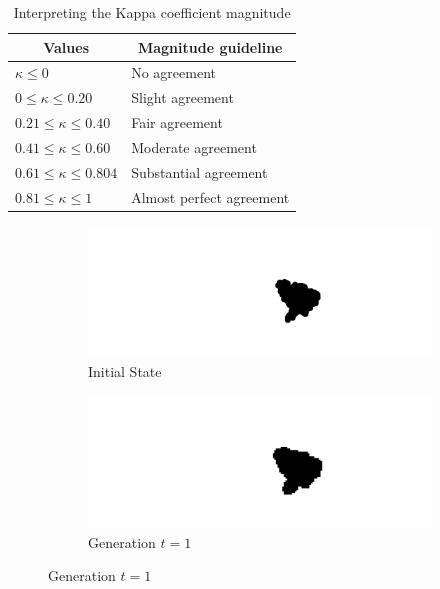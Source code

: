 \begin{table}[H]
\centering
\caption{Interpreting the Kappa coefficient magnitude}
\label{table:kap}
\begin{tabular}{@{}ll@{}}
\toprule
\multicolumn{1}{c}{Values} & \multicolumn{1}{c}{Magnitude guideline} \\ \midrule
$\kappa \leq 0$                & No agreement                            \\
$0 \leq \kappa \leq 0.20$                     & Slight agreement                        \\
$0.21 \leq \kappa \leq 0.40$                  & Fair agreement                          \\
$0.41 \leq \kappa \leq 0.60$                  & Moderate agreement                      \\
$0.61 \leq \kappa \leq 0.804$                  & Substantial agreement                   \\
$0.81 \leq \kappa \leq 1$                     & Almost perfect agreement                \\ \bottomrule
\end{tabular}
\end{table}
\label{Chapter4} %
\begin{figure}[H]
\begin{subfigure}{.5\textwidth}
  \centering
  \includegraphics[width=1\linewidth]{Figures/Chapter4/generation-0-melusi}
  \caption*{Initial State}
\end{subfigure}
\begin{subfigure}{.5\textwidth}
  \centering
  \includegraphics[width=1\linewidth]{Figures/Chapter4/generation-1-melusi}
  \caption*{Generation $t = 1$}
\end{subfigure}
\end{figure}

